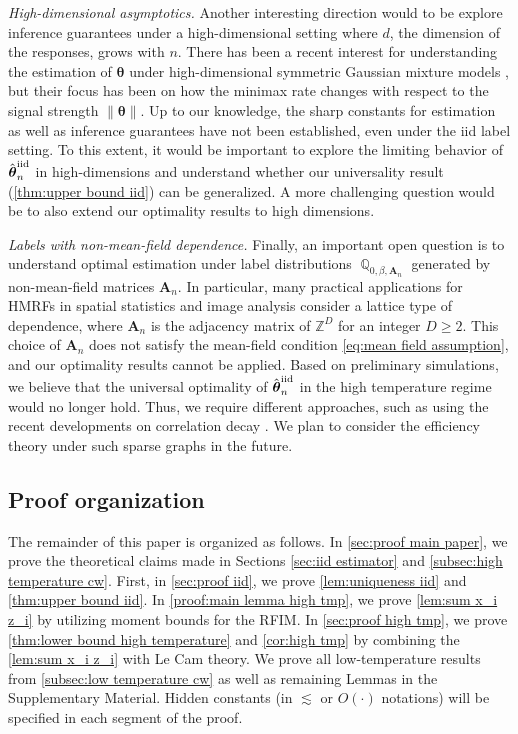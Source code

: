 \documentclass[preprint,reqno]{imsart}
\newcommand{\ttheta}{\boldsymbol{\theta}}
\DeclareMathOperator{\QQ}{\mathbb{Q}}
\newcommand{\A}{\mathbf{A}}
\newcommand{\thetaiid}{\hat{\boldsymbol \theta}^{\text{iid}}_{\mathnormal n}}
\begin{document}
%
\vspace{2mm}
\noindent \emph{High-dimensional asymptotics.}
Another interesting direction would to be explore inference guarantees under a high-dimensional setting where $d$, the dimension of the responses, grows with $n$. There has been a recent interest for understanding the estimation of $\ttheta$ under high-dimensional symmetric Gaussian mixture models \citep[][and the references therein]{wu2021randomly, dwivedi2020singularity, karagulyan2024adaptive}, but their focus has been on how the minimax rate changes with respect to the signal strength $\lVert\ttheta\rVert$. Up to our knowledge, the sharp constants for estimation as well as inference guarantees have not been established, even under the iid label setting. To this extent, it would be important to explore the limiting behavior of $\thetaiid$ in high-dimensions and understand whether our universality result (\cref{thm:upper bound iid}) can be generalized. A more challenging question would be to also extend our optimality results to high dimensions.

\vspace{2mm}
\noindent \emph{Labels with non-mean-field dependence.} Finally, an important open question is to understand optimal estimation under label distributions $\QQ_{0,\beta,\A_n}$ generated by non-mean-field matrices $\A_n$. In particular, many practical applications for HMRFs in spatial statistics and image analysis consider a lattice type of dependence, where $ \A_n$ is the adjacency matrix of $\mathbb{Z}^D$ for an integer $D \ge 2$. This choice of $ \A_n$ does not satisfy the mean-field condition \eqref{eq:mean field assumption}, and our optimality results cannot be applied. Based on preliminary simulations, we believe that the universal optimality of $\thetaiid$ in the high temperature regime would no longer hold. Thus, we require different approaches, such as using the recent developments on correlation decay \citep{mukherjee2022testing, ding2023new}. %
We plan to consider the efficiency theory under such sparse graphs in the future.





\subsection{Proof organization}
The remainder of this paper is organized as follows. {In \cref{sec:proof main paper}, we prove the theoretical claims made in Sections \ref{sec:iid estimator} and \ref{subsec:high temperature cw}. First, in \cref{sec:proof iid}, we prove \cref{lem:uniqueness iid} and \cref{thm:upper bound iid}. In \cref{proof:main lemma high tmp}, we prove \cref{lem:sum x_i z_i} by utilizing moment bounds for the RFIM. In \cref{sec:proof high tmp}, we prove \cref{thm:lower bound high temperature} and \cref{cor:high tmp} by combining the \cref{lem:sum x_i z_i} with Le Cam theory.}
%
We prove all low-temperature results from \cref{subsec:low temperature cw} as well as remaining Lemmas in the Supplementary Material. Hidden constants (in $\lesssim$ or $O(\cdot)$ notations) will be specified in each segment of the proof.
\end{document}
